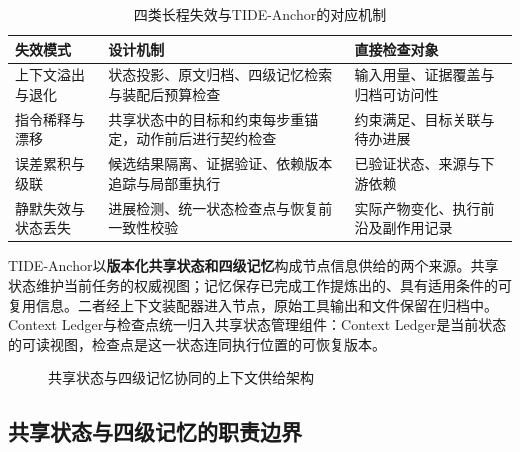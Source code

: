 \begin{table}[htbp]
\centering
\caption{四类长程失效与TIDE-Anchor的对应机制}
\label{tab:anchor_failure_mapping}
\begin{tabular}{p{}p{}p{}}
\toprule
失效模式 & 设计机制 & 直接检查对象 \\
\midrule
上下文溢出与退化 & 状态投影、原文归档、四级记忆检索与装配后预算检查 & 输入用量、证据覆盖与归档可访问性 \\
指令稀释与漂移 & 共享状态中的目标和约束每步重锚定，动作前后进行契约检查 & 约束满足、目标关联与待办进展 \\
误差累积与级联 & 候选结果隔离、证据验证、依赖版本追踪与局部重执行 & 已验证状态、来源与下游依赖 \\
静默失效与状态丢失 & 进展检测、统一状态检查点与恢复前一致性校验 & 实际产物变化、执行前沿及副作用记录 \\
\bottomrule
\end{tabular}
\end{table}

TIDE-Anchor以\textbf{版本化共享状态和四级记忆}构成节点信息供给的两个来源。共享状态维护当前任务的权威视图；记忆保存已完成工作提炼出的、具有适用条件的可复用信息。二者经上下文装配器进入节点，原始工具输出和文件保留在归档中。Context Ledger与检查点统一归入共享状态管理组件：Context Ledger是当前状态的可读视图，检查点是这一状态连同执行位置的可恢复版本。

\begin{figure}[htbp]
\centering
{}
\caption{共享状态与四级记忆协同的上下文供给架构}
\label{fig:anchor_memory}
\label{fig:anchor_context}
\end{figure}

\subsection{共享状态与四级记忆的职责边界}

